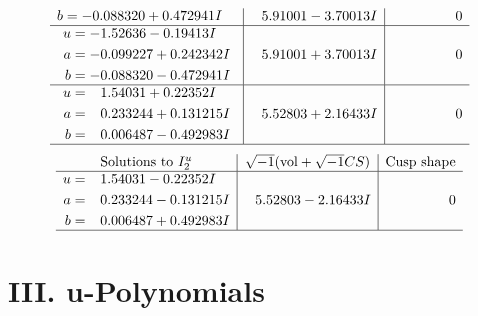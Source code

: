 \documentclass[1p]{elsarticle_modified}
\theoremstyle{definition}
\newcommand{\I}{\sqrt{-1}}
\begin{document}
$$\begin{array}{c|c|c}
\begin{aligned}
b &= -0.088320 + 0.472941 I\end{aligned}
 & \phantom{-}5.91001 - 3.70013 I & \phantom{-0.000000 } 0 \\ \hline\begin{aligned}
u &= -1.52636 - 0.19413 I \\
a &= -0.099227 + 0.242342 I \\
b &= -0.088320 - 0.472941 I\end{aligned}
 & \phantom{-}5.91001 + 3.70013 I & \phantom{-0.000000 } 0 \\ \hline\begin{aligned}
u &= \phantom{-}1.54031 + 0.22352 I \\
a &= \phantom{-}0.233244 + 0.131215 I \\
b &= \phantom{-}0.006487 - 0.492983 I\end{aligned}
 & \phantom{-}5.52803 + 2.16433 I & \phantom{-0.000000 } 0\\
 \hline 
 \end{array}$$\newpage$$\begin{array}{c|c|c}  
\text{Solutions to }I^u_{2}& \I (\text{vol} + \sqrt{-1}CS) & \text{Cusp shape}\\
 \hline 
\begin{aligned}
u &= \phantom{-}1.54031 - 0.22352 I \\
a &= \phantom{-}0.233244 - 0.131215 I \\
b &= \phantom{-}0.006487 + 0.492983 I\end{aligned}
 & \phantom{-}5.52803 - 2.16433 I & \phantom{-0.000000 } 0\\
 \hline 
 \end{array}$$\newpage
\newpage\renewcommand{\arraystretch}{1}
\centering \section*{ III. u-Polynomials}
\end{document}
